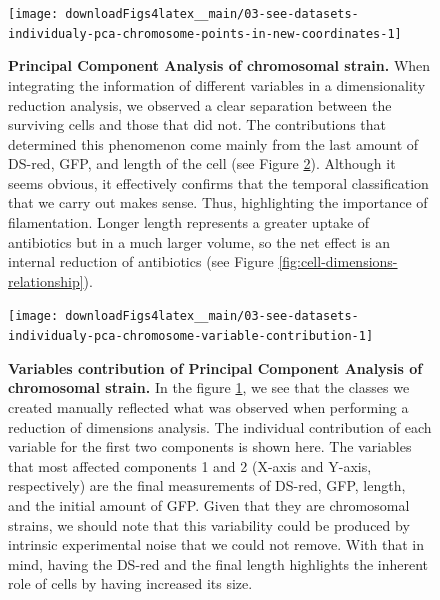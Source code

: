 \documentclass[a4paper, nobind]{templates/ociamthesis}
\begin{document}
\begin{figure}[H]
\texttt{[image: downloadFigs4latex\_\_main/03-see-datasets-individualy-pca-chromosome-points-in-new-coordinates-1]} \caption[Principal Component Analysis of chromosomal strain.]{\textbf{Principal Component Analysis of chromosomal strain.} When integrating the information of different variables in a dimensionality reduction analysis, we observed a clear separation between the surviving cells and those that did not. The contributions that determined this phenomenon come mainly from the last amount of DS-red, GFP, and length of the cell (see Figure \ref{fig:03-see-datasets-individualy-pca-chromosome-variable-contribution-1}). Although it seems obvious, it effectively confirms that the temporal classification that we carry out makes sense. Thus, highlighting the importance of filamentation. Longer length represents a greater uptake of antibiotics but in a much larger volume, so the net effect is an internal reduction of antibiotics (see Figure \ref{fig:cell-dimensions-relationship}).}\label{fig:03-see-datasets-individualy-pca-chromosome-points-in-new-coordinates-1}
\end{figure}





\begin{figure}[H]
\texttt{[image: downloadFigs4latex\_\_main/03-see-datasets-individualy-pca-chromosome-variable-contribution-1]} \caption[Variables contribution of Principal Component Analysis of chromosomal strain.]{\textbf{Variables contribution of Principal Component Analysis of chromosomal strain.} In the figure \ref{fig:03-see-datasets-individualy-pca-chromosome-points-in-new-coordinates-1}, we see that the classes we created manually reflected what was observed when performing a reduction of dimensions analysis. The individual contribution of each variable for the first two components is shown here. The variables that most affected components 1 and 2 (X-axis and Y-axis, respectively) are the final measurements of DS-red, GFP, length, and the initial amount of GFP. Given that they are chromosomal strains, we should note that this variability could be produced by intrinsic experimental noise that we could not remove. With that in mind, having the DS-red and the final length highlights the inherent role of cells by having increased its size.}\label{fig:03-see-datasets-individualy-pca-chromosome-variable-contribution-1}
\end{figure}
\end{document}

